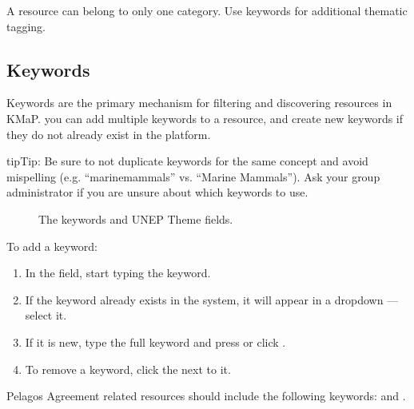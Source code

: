 \documentclass[letterpaper,10pt,english]{sphinxmanual}
\begin{document}
\sphinxAtStartPar
A resource can belong to only one category. Use keywords for additional
thematic tagging.


\subsection{Keywords}
\label{\detokenize{03_managing_metadata:keywords}}
\sphinxAtStartPar
Keywords are the primary mechanism for filtering and discovering resources in KMaP.
you can add multiple keywords to a resource, and create new keywords if they do not already
exist in the platform.

\begin{sphinxadmonition}{tip}{Tip:}
\sphinxAtStartPar
Be sure to not duplicate keywords for the same concept and avoid mispelling (e.g. “marinemammals” vs. “Marine Mammals”).
Ask your group administrator if you are unsure about which keywords to use.
\end{sphinxadmonition}

\begin{figure}[htbp]
\centering
\capstart

\noindent{}
\caption{The keywords and UNEP Theme fields.}\label{\detokenize{03_managing_metadata:id7}}\end{figure}

\sphinxAtStartPar
To add a keyword:
\begin{enumerate}
%
\item {} 
\sphinxAtStartPar
In the  field, start typing the keyword.

\item {} 
\sphinxAtStartPar
If the keyword already exists in the system, it will appear in a dropdown — select it.

\item {} 
\sphinxAtStartPar
If it is new, type the full keyword and press  or click .

\item {} 
\sphinxAtStartPar
To remove a keyword, click the  next to it.

\end{enumerate}

\sphinxAtStartPar
Pelagos Agreement related resources should include the following keywords:  and .
\end{document}
